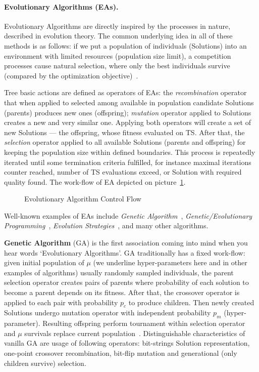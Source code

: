 \paragraph{Evolutionary Algorithms (EAs).} Evolutionary Algorithms are directly inspired by the processes in nature, described in evolution theory. The common underlying idea in all of these methods is as follows: if we put a population of individuals (Solutions) into an environment with limited resources (population size limit), a competition processes cause natural selection, where only the best individuals survive (compared by the optimization objective)~\cite{eiben2015evolutionary}.

Tree basic actions are defined as operators of EAs: the \textit{recombination} operator that when applied to selected among available in population candidate Solutions (parents) produces new ones (offspring); \textit{mutation} operator applied to Solutions creates a new and very similar one. 
Applying both operators will create a set of new Solutions — the offspring, whose fitness evaluated on TS. After that, the \textit{selection} operator applied to all available Solutions (parents and offspring) for keeping the population size within defined boundaries. This process is repeatedly iterated until some termination criteria fulfilled, for instance maximal iterations counter reached, number of TS evaluations exceed, or Solution with required quality found. The work-flow of EA depicted on picture~\ref{bg:pic:EAs}.

\begin{figure}
	\centering
	
	\caption{Evolutionary Algorithm Control Flow}
	\label{bg:pic:EAs}
\end{figure}

Well-known examples of EAs include \textit{Genetic Algorithm}~\cite{sastry2005genetic}, \textit{Genetic/Evolutionary Programming}~\cite{koza1992evolution}, \textit{Evolution Strategies}~\cite{beyer2002evolution}, and many other algorithms.

\textbf{Genetic Algorithm} (GA) is the first association coming into mind when you hear words `Evolutionary Algorithms'. GA traditionally has a fixed work-flow: given initial population of \underline{$\mu$} (we underline hyper-parameters here and in other examples of algorithms) usually randomly sampled individuals, the parent selection operator creates pairs of parents where probability of each solution to become a parent depends on its fitness. After that, the crossover operator is applied to each pair with probability \underline{$p_c$} to produce children. Then newly created Solutions undergo mutation operator with independent probability \underline{$p_m$} (hyper-parameter). Resulting offspring perform tournament within selection operator and \underline{$\mu$} survivals replace current population~\cite{eiben2015popular}. Distinguishable characteristics of vanilla GA are usage of following operators: bit-strings Solution representation, one-point crossover recombination, bit-flip mutation and generational (only children survive) selection.

